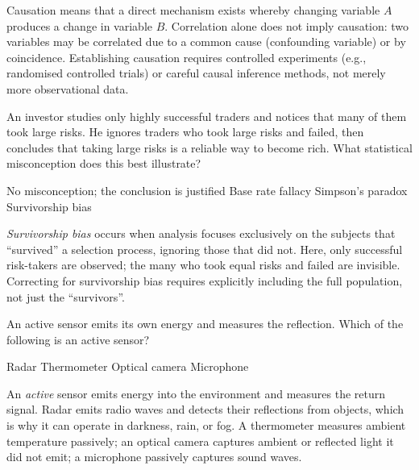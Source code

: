 \documentclass[answers]{exam}
\begin{document}
\begin{questions}
\begin{solution}
    Causation means that a direct mechanism exists whereby changing variable $A$ produces a change in variable $B$.
    Correlation alone does not imply causation: two variables may be correlated due to a common cause (confounding variable) or by coincidence.
    Establishing causation requires controlled experiments (e.g., randomised controlled trials) or careful causal inference methods, not merely more observational data.
\end{solution}

\question An investor studies only highly successful traders and notices that many of them took large risks. He ignores traders who took large risks and failed, then concludes that taking large risks is a reliable way to become rich. What statistical misconception does this best illustrate?

\begin{choices}
    \choice No misconception; the conclusion is justified
    \choice Base rate fallacy
    \choice Simpson's paradox
    \correctchoice Survivorship bias
\end{choices}

\begin{solution}
    \textit{Survivorship bias} occurs when analysis focuses exclusively on the subjects that ``survived'' a selection process, ignoring those that did not.
    Here, only successful risk-takers are observed; the many who took equal risks and failed are invisible.
    Correcting for survivorship bias requires explicitly including the full population, not just the ``survivors''.
\end{solution}

\question An active sensor emits its own energy and measures the reflection. Which of the following is an active sensor?

\begin{oneparchoices}
    \correctchoice Radar
    \choice Thermometer
    \choice Optical camera
    \choice Microphone
\end{oneparchoices}

\begin{solution}
    An \textit{active} sensor emits energy into the environment and measures the return signal.
    Radar emits radio waves and detects their reflections from objects, which is why it can operate in darkness, rain, or fog.
    A thermometer measures ambient temperature passively; an optical camera captures ambient or reflected light it did not emit; a microphone passively captures sound waves.
\end{solution}


\end{questions}
\end{document}

